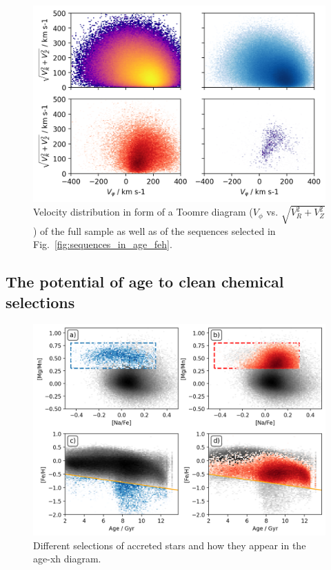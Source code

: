 \documentclass[fleqn,usenatbib]{mnras}
\begin{document}
\begin{figure}
	\includegraphics[width=\columnwidth]{figures/sequences_in_toomre.png}
    \caption{Velocity distribution in form of a Toomre diagram ($V_\phi$ vs. $\sqrt{V_R^2 + V_Z^2}$) of the full sample as well as of the sequences selected in Fig.~\ref{fig:sequences_in_age_feh}.}
    \label{fig:sequences_in_toomre}
\end{figure}

\subsection{The potential of age to clean chemical selections}

\begin{figure}
	\includegraphics[width=\columnwidth]{figures/NaFe_MgMn_selection_Age_FeH_dissection.png}
    \caption{Different selections of accreted stars and how they appear in the age-xh diagram.}
    \label{fig:NaFe_MgMn_selection_Age_FeH_dissection}
\end{figure}
\end{document}
